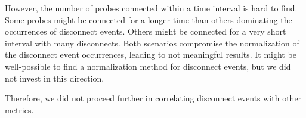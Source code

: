 However, the number of probes connected within a time interval is hard to find.
Some probes might be connected for a longer time than others dominating the
occurrences of disconnect events. Others might be connected for a very short
interval with many disconnects. Both scenarios compromise the normalization of
the disconnect event occurrences, leading to not meaningful results. It might
be well-possible to find a normalization method for disconnect events, but we
did not invest in this direction.

Therefore, we did not proceed further in correlating disconnect events with
other metrics.
